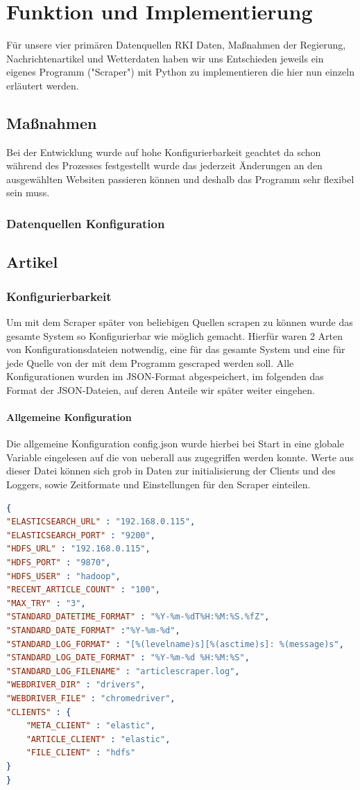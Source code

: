 \documentclass[12pt,oneside,a4paper,parskip]{scrbook}
\begin{document}
\chapter{Funktion und Implementierung}

Für unsere vier primären Datenquellen RKI Daten, Maßnahmen der Regierung, Nachrichtenartikel und Wetterdaten haben wir uns Entschieden jeweils ein eigenes Programm ("Scraper") mit Python zu implementieren die hier nun einzeln erläutert werden.

\section{Maßnahmen}
Bei der Entwicklung wurde auf hohe Konfigurierbarkeit geachtet da schon während des Prozesses festgestellt wurde das jederzeit Änderungen an den ausgewählten Websiten passieren können und deshalb das Programm sehr flexibel sein muss.

\subsection{Datenquellen Konfiguration}

\section{Artikel}
\subsection{Konfigurierbarkeit}
Um mit dem Scraper später von beliebigen Quellen scrapen zu können wurde das gesamte System so Konfigurierbar wie möglich gemacht. Hierfür waren 2 Arten von Konfigurationsdateien notwendig, eine für das gesamte System und eine für jede Quelle von der mit dem Programm gescraped werden soll. Alle Konfigurationen wurden im JSON-Format abgespeichert, im folgenden das Format der JSON-Dateien, auf deren Anteile wir später weiter eingehen.
\subsubsection{Allgemeine Konfiguration}
Die allgemeine Konfiguration config.json wurde hierbei bei Start in eine globale Variable eingelesen auf die von ueberall aus zugegriffen werden konnte. Werte aus dieser Datei können sich grob in Daten zur initialisierung der Clients und des Loggers, sowie Zeitformate und Einstellungen für den Scraper einteilen.
\begin{lstlisting}[caption=config.json,label=config,language=json]
{
"ELASTICSEARCH_URL" : "192.168.0.115",
"ELASTICSEARCH_PORT" : "9200",
"HDFS_URL" : "192.168.0.115",
"HDFS_PORT" : "9870",
"HDFS_USER" : "hadoop",
"RECENT_ARTICLE_COUNT" : "100",
"MAX_TRY" : "3",
"STANDARD_DATETIME_FORMAT" : "%Y-%m-%dT%H:%M:%S.%fZ",
"STANDARD_DATE_FORMAT" :"%Y-%m-%d",
"STANDARD_LOG_FORMAT" : "[%(levelname)s][%(asctime)s]: %(message)s",
"STANDARD_LOG_DATE_FORMAT" : "%Y-%m-%d %H:%M:%S",
"STANDARD_LOG_FILENAME" : "articlescraper.log",
"WEBDRIVER_DIR" : "drivers",
"WEBDRIVER_FILE" : "chromedriver",
"CLIENTS" : {
    "META_CLIENT" : "elastic",
    "ARTICLE_CLIENT" : "elastic",
    "FILE_CLIENT" : "hdfs"
}
}
\end{lstlisting}
\end{document}
